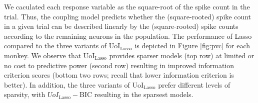 \documentclass[11pt]{article}
\begin{document}
We caculated each response variable as the square-root of the spike count in the trial. Thus, the coupling model predicts whether the (square-rooted) spike count in a given trial can be described linearly by the (square-rooted) spike counts according to the remaining neurons in the population. The performance of Lasso compared to the three variants of UoI$_{\text{Lasso}}$ is depicted in Figure \ref{fig:pvc} for each monkey. We observe that UoI$_{\text{Lasso}}$ provides sparser models (top row) at limited or no cost to predictive power (second row) resulting in improved information criterion scores (bottom two rows; recall that lower information criterion is better). In addition, the three variants of UoI$_{\text{Lasso}}$ prefer different levels of sparsity, with $UoI_{\text{Lasso}}-$BIC resulting in the sparsest models.
\end{document}
